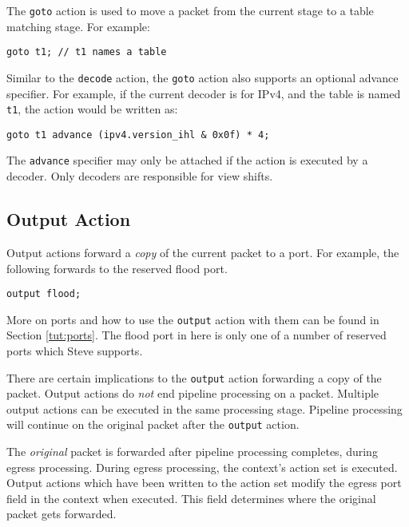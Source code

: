 The \texttt{goto} action is used to move a packet from the current stage to a
table matching stage. For example:

\begin{lstlisting}
goto t1; // t1 names a table
\end{lstlisting}

Similar to the \texttt{decode} action, the \texttt{goto} action also supports an
optional advance specifier. For example, if the current decoder is for IPv4, and
the table is named \texttt{t1}, the action would be written as:

\begin{lstlisting}
goto t1 advance (ipv4.version_ihl & 0x0f) * 4;
\end{lstlisting}

The \texttt{advance} specifier may only be attached if the action is executed by a
decoder. Only decoders are responsible for view shifts.

\subsection{Output Action} \label{tut:output_action}

Output actions forward a \textit{copy} of the current packet to a port. 
For example, the following forwards to the reserved flood port. 

\begin{codepage}
\begin{lstlisting}
output flood;
\end{lstlisting}
\end{codepage}

More on ports and how to use the \texttt{output} action with them can
be found in Section \ref{tut:ports}. The flood port in here is only one
of a number of reserved ports which Steve supports.

There are certain implications to the \texttt{output} action forwarding a copy of the packet. 
Output actions do \emph{not} end pipeline processing on a packet.
Multiple output actions can be executed in the same processing stage. 
Pipeline processing will continue
on the original packet after the \texttt{output} action.

The \textit{original} packet is forwarded after pipeline processing completes,
during egress processing.
During egress processing, the context's action set is executed.
Output actions which have been written to the action set modify the
egress port field in the context when executed.
This field determines where the original packet gets forwarded.

